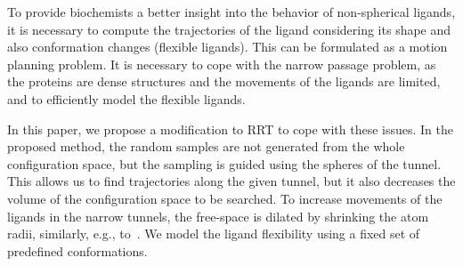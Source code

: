 \documentclass[usletter, 10pt, conference]{ieeeconf} %
\begin{document}
To provide biochemists  a better insight into the behavior of non-spherical ligands, it is necessary to compute the trajectories of the ligand considering its shape and also conformation changes (flexible ligands).
This can be formulated as a motion planning problem.
It is necessary to cope with the narrow passage problem, as the proteins are dense structures and the movements of the ligands are limited, and to efficiently model the flexible ligands.

In this paper, we propose a modification to RRT to cope with these issues.
In the proposed method, the random samples are not generated from the whole configuration space, but the sampling is guided using
the spheres of the tunnel.
This allows us to find trajectories along the given tunnel, but it also decreases the volume of the configuration space to be searched.
To increase movements of the ligands in the narrow tunnels, the free-space is dilated by 
shrinking the atom radii, similarly, e.g., to~\cite{cortes2005path,hsu06multilevel}.
We model the ligand flexibility using a fixed set of predefined conformations.


\end{document}
